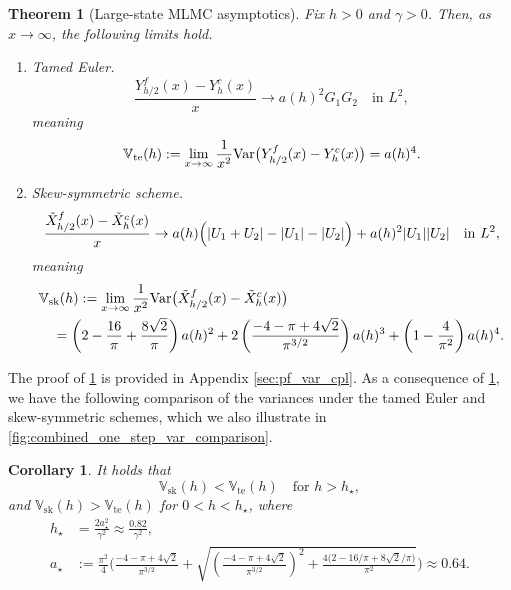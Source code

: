 \documentclass[11pt]{article}
\newtheorem{theorem}{Theorem}
\newtheorem{corollary}{Corollary}
\begin{document}
\begin{theorem}[Large-state MLMC asymptotics]
\label{thm:main}
Fix $h>0$ and $\gamma>0$. Then, as $x \to \infty$, the following limits hold.

\begin{enumerate}[leftmargin=0.5cm]
\item[(i)] Tamed Euler.
\[
\frac{Y_{h/2}^f(x) - Y_h^c(x)}{x}
\rightarrow
a(h)^2 G_1 G_2
\quad \text{in } L^2,
\]
meaning
\[
\mathbb{V}_\mathrm{te}(h) := \lim_{x\to\infty}
\frac{1}{x^2}
\textup{Var} \bigl(Y_{h/2}^f(x) - Y_h^c(x)\bigr)
=
a(h)^4.
\]

\item[(ii)] Skew-symmetric scheme.
\[
\frac{\tilde{X}_{h/2}^f(x) - \tilde{X}_h^c(x)}{x}
\rightarrow
a(h)\Bigl(|U_1+U_2| - |U_1| - |U_2|\Bigr)
+ a(h)^2 |U_1||U_2|
\quad \text{in } L^2,
\]
meaning
\begin{align*}
& \mathbb{V}_{\mathrm{sk}}(h)
:=
\lim_{x\to\infty}
\frac{1}{x^2}\textup{Var}\bigl(\tilde{X}_{h/2}^f(x) - \tilde{X}_h^c(x)\bigr)
\\
&\quad=
\left( 2 - \frac{16}{\pi} + \frac{8\sqrt{2}}{\pi} \right) a(h)^2 
+ 
2 \left(\frac{-4 - \pi + 4\sqrt{2}}{\pi^{3/2}}\right) a(h)^3 
+ 
\left( 1 - \frac{4}{\pi^2} \right) a(h)^4.
\end{align*}
\end{enumerate}
\end{theorem}
The proof of \cref{thm:main} is provided in Appendix \ref{sec:pf_var_cpl}. As a consequence of \cref{thm:main}, we have the following comparison of the variances under the tamed Euler and skew-symmetric schemes, which we also illustrate in \cref{fig:combined_one_step_var_comparison}.
% 
\begin{corollary} 
\label{cor:comparison}
It holds that
\[
\mathbb{V}_{\mathrm{sk}}(h) < \mathbb{V}_{\mathrm{te}}(h)
\quad \text{for } h > h_\star,
\]
and $\mathbb{V}_{\mathrm{sk}}(h) > \mathbb{V}_{\mathrm{te}}(h)$ for $0< h < h_\star$, where 
\begin{align*}
h_\star 
&= \frac{2a_\star^2}{\gamma^2} \approx \frac{0.82}{\gamma^2}, 
\\
a_\star
&:=
\frac{\pi^2}{4}
\Biggl(
\frac{-4-\pi+4\sqrt{2}}{\pi^{3/2}} + \sqrt{\left(\frac{-4-\pi+4\sqrt{2}}{\pi^{3/2}}\right)^2 + \frac{4 \bigl(2 - 16/\pi + 8\sqrt{2}/\pi \bigr)}{\pi^2}}
\Biggr) \approx 0.64.
\end{align*}
\end{corollary}
\end{document}
